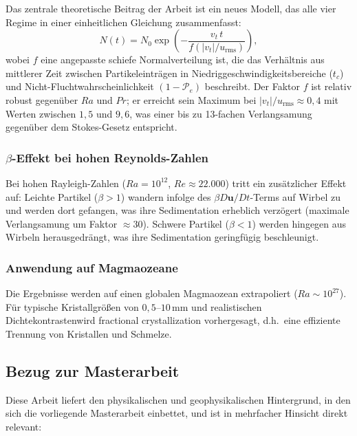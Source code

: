 \documentclass[a4paper,12pt]{article}
\begin{document}
Das zentrale theoretische Beitrag der Arbeit ist ein neues Modell, das alle vier Regime in einer einheitlichen Gleichung zusammenfasst:
\begin{equation}
    N(t) = N_0 \exp\!\left(-\frac{v_t\, t}{f(|v_t|/u_\mathrm{rms})}\right),
\end{equation}
wobei $f$ eine angepasste schiefe Normalverteilung ist, die das Verh\"altnis aus mittlerer Zeit zwischen Partikeleintr\"agen in Niedriggeschwindigkeitsbereiche ($t_c$) und Nicht-Fluchtwahrscheinlichkeit $(1-\mathcal{P}_e)$ beschreibt. Der Faktor $f$ ist relativ robust gegen\"uber $Ra$ und $Pr$; er erreicht sein Maximum bei $|v_t|/u_\mathrm{rms} \approx 0{,}4$ mit Werten zwischen $1{,}5$ und $9{,}6$, was einer bis zu 13-fachen Verlangsamung gegen\"uber dem Stokes-Gesetz entspricht.

\subsubsection*{$\beta$-Effekt bei hohen Reynolds-Zahlen}

Bei hohen Rayleigh-Zahlen ($Ra = 10^{12}$, $Re \approx 22.000$) tritt ein zus\"atzlicher Effekt auf: Leichte Partikel ($\beta > 1$) wandern infolge des $\beta D\mathbf{u}/Dt$-Terms auf Wirbel zu und werden dort gefangen, was ihre Sedimentation erheblich verzögert (maximale Verlangsamung um Faktor $\approx 30$). Schwere Partikel ($\beta < 1$) werden hingegen aus Wirbeln herausgedr\"angt, was ihre Sedimentation geringf\"ugig beschleunigt.

\subsubsection*{Anwendung auf Magmaozeane}

Die Ergebnisse werden auf einen globalen Magmaozean extrapoliert ($Ra \sim 10^{27}$). F\"ur typische Kristallgr\"o\ss{}en von $0{,}5$--$10\,\mathrm{mm}$ und realistischen Dichtekontrastenwird fractional crystallization vorhergesagt, d.h.\ eine effiziente Trennung von Kristallen und Schmelze.

\subsection*{Bezug zur Masterarbeit}

Diese Arbeit liefert den physikalischen und geophysikalischen Hintergrund, in den sich die vorliegende Masterarbeit einbettet, und ist in mehrfacher Hinsicht direkt relevant:
\end{document}
